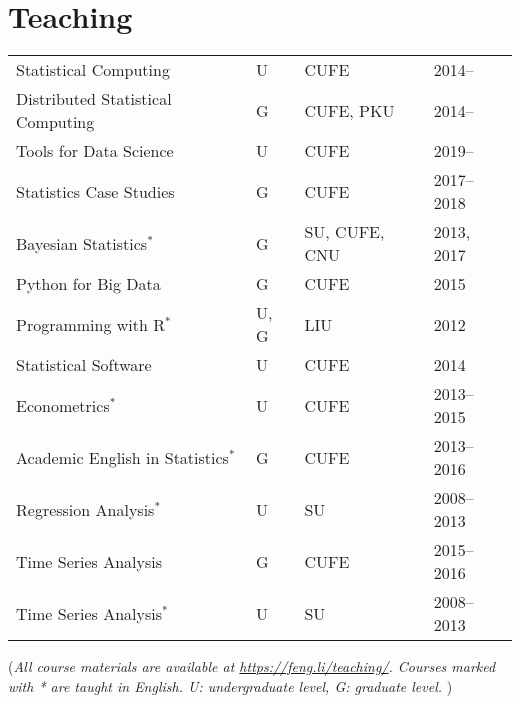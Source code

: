 \documentclass[twoside,a4paper,11pt]{amsart}
\begin{document}
\section*{Teaching}
\begin{center}
\begin{tabular}{p{6.5cm}lll}
  {Statistical Computing}              & U    & CUFE          & 2014--     \\
  {Distributed Statistical Computing}  & G    & CUFE, PKU     & 2014--     \\
  {Tools for Data Science}             & U    & CUFE          & 2019--     \\
  {Statistics Case Studies}            & G    & CUFE          & 2017--2018 \\
  {Bayesian Statistics}$^*$            & G    & SU, CUFE, CNU & 2013, 2017 \\
  {Python for Big Data}                & G    & CUFE          & 2015       \\
  {Programming with R}$^*$             & U, G & LIU           & 2012       \\
  {Statistical Software}               & U    & CUFE          & 2014       \\
  {Econometrics}$^*$                   & U    & CUFE          & 2013--2015 \\
  {Academic English in Statistics}$^*$ & G    & CUFE          & 2013--2016 \\
  {Regression Analysis}$^*$            & U    & SU            & 2008--2013 \\
  {Time Series Analysis}               & G    & CUFE          & 2015--2016 \\
  {Time Series Analysis}$^*$           & U    & SU            & 2008--2013 \\
\end{tabular}
\end{center}
{\footnotesize (\emph{All course materials are available at
    \emph{\url{https://feng.li/teaching/}}. Courses marked with * are taught in English. U: undergraduate level, G: graduate level. })}
\end{document}
